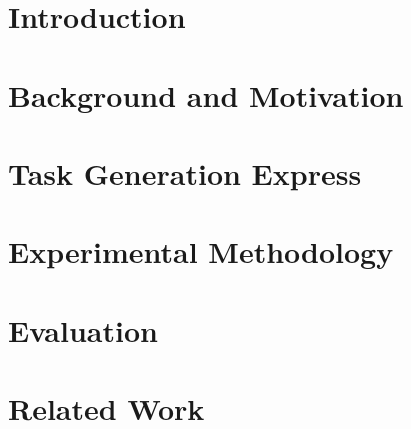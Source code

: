\documentclass{llncs}
\begin{document}




%


\section{Introduction}
\label{sec:intro}



\section{Background and Motivation}
\label{sec:background}


\section{Task Generation Express}
\label{sec:ram}



\section{Experimental Methodology}
\label{sec:experimental}


\section{Evaluation}
\label{sec:evaluation}


\section{Related Work}
\label{sec:related}

\end{document}
